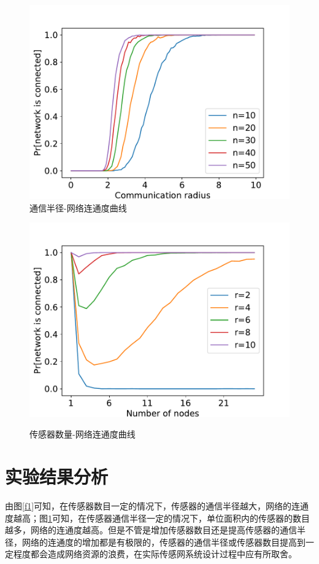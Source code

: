 \documentclass[a4paper]{ctexart}
\begin{document}
\begin{spacing}{1}
\begin{figure}[htbp]
	\begin{minipage}[t]{0.5\textwidth}
		\centering
		\includegraphics[width=1.1\textwidth, keepaspectratio]{figure/Figure_1.pdf}\\
		\caption{通信半径-网络连通度曲线}\label{f1}
	\end{minipage}%
	\hfill
	\begin{minipage}[t]{0.5\textwidth}
		\centering
		\includegraphics[width=1.1\textwidth, keepaspectratio]{figure/Figure_2.pdf}\\
		\caption{传感器数量-网络连通度曲线}\label{f2}
	\end{minipage}
\end{figure}

\section{实验结果分析}
由图\ref{f1}可知，在传感器数目一定的情况下，传感器的通信半径越大，网络的连通度越高；图\ref{f2}可知，在传感器通信半径一定的情况下，单位面积内的传感器的数目越多，网络的连通度越高。但是不管是增加传感器数目还是提高传感器的通信半径，网络的连通度的增加都是有极限的，传感器的通信半径或传感器数目提高到一定程度都会造成网络资源的浪费，在实际传感网系统设计过程中应有所取舍。
\end{spacing}
\end{document}
